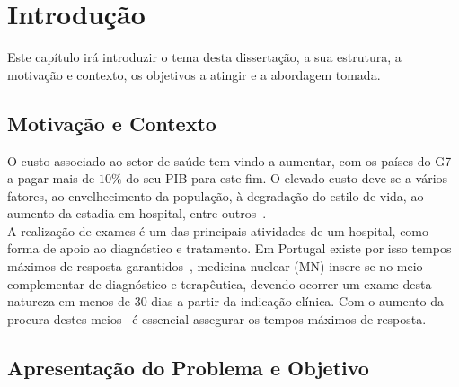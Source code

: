 
%

\chapter{Introdução}
\label{cha:intrudução}


\epigraphfontsize{\small\itshape}
\setlength\epigraphwidth{12.5cm}
\setlength\epigraphrule{0pt}

Este capítulo irá introduzir o tema desta dissertação, a sua estrutura, a motivação e contexto, os objetivos a atingir e a abordagem tomada.\\


\section{Motivação e Contexto}
\label{sec:motivação_e_contexto}

O custo associado ao setor de saúde tem vindo a aumentar, com os países do G7 a pagar mais de $10\%$ do seu PIB para este fim. O elevado custo deve-se a vários fatores, ao envelhecimento da população, à degradação do estilo de vida, ao aumento da estadia em hospital, entre outros~\cite{meskarpouramiriSystematicReviewFactors2021}.\\
A realização de exames é um das principais atividades de um hospital, como forma de apoio ao diagnóstico e tratamento. Em Portugal existe por isso tempos máximos de resposta garantidos~\cite{saudeERSTemposMaximos}, medicina nuclear (MN) insere-se no meio complementar de diagnóstico e terapêutica, devendo ocorrer um exame desta natureza em menos de 30 dias a partir da indicação clínica. Com o aumento da procura destes meios~\cite{almenTrendsDiagnosticNuclear2025} é essencial assegurar os tempos máximos de resposta.\\

\section{Apresentação do Problema e Objetivo}
\label{sec:apresentação_do_problema_e_objetivo}

